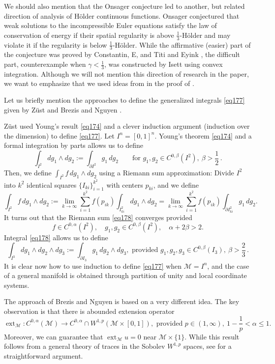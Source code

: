 \documentclass[intlimits,12pt,reqno]{amsart}
\newcommand{\cM}{\mathcal M}
\numberwithin{equation}{section}
\def\ext{\operatorname{ext}}
\theoremstyle{definition}
\begin{document}
We should also mention that the Onsager conjecture \cite{Onsager} led to another, but related direction of analysis of H\"older continuous functions. Onsager conjectured that weak solutions to the incompressible Euler equations satisfy
the law of conservation of energy if their spatial regularity is above $\frac{1}{3}$-H\"older and 
may violate it if the regularity is below $\frac{1}{3}$-H\"older. While the affirmative (easier) part of the conjecture was proved by Constantin, E, and Titi \cite{CET94} and Eyink \cite{Eyink}, the difficult part, counterexample when $\gamma<\frac{1}{3}$, was constructed by Isett \cite{Isett} using convex integration. Although we will not mention this direction of research in the paper, we want to emphasize that we used ideas from \cite{CET94} in the proof of .

Let us briefly mention the approaches to define the generalized integrals \eqref{eq177} given by Z\"ust \cite{zust1,zust2} and Brezis and Nguyen \cite{brezisn1,brezisn2}.

Z\"ust used Young's result \eqref{eq174} and a clever induction argument (induction over the dimension) to define \eqref{eq177}. 
Let $I^n=[0,1]^n$. Young's theorem \eqref{eq174} and a formal integration by parts allows us to define
$$
\int_{I^2} dg_1\wedge dg_2:=\int_{\partial I^2} g_1\, dg_2
\qquad
\text{for } g_1,g_2\in C^{0,\beta}(I^2),\ \textstyle{\beta>\frac{1}{2}}\, .
$$
Then, we define $\int_{I^2}f\, dg_1\wedge dg_2$ using a Riemann sum approximation: Divide $I^2$ into $k^2$ identical squares $\{I_{ki}\}_{i=1}^{k^2}$ with centers $p_{ki}$, and we define
\begin{equation}
\label{eq178}
\int_{I^2} f\, dg_1\wedge dg_2:=
\lim_{k\to\infty}\sum_{i=1}^{k^2} f(p_{ik})\int_{I_{ki}^2} dg_1\wedge dg_2=
\lim_{k\to\infty}\sum_{i=1}^{k^2} f(p_{ik})\int_{\partial I_{ki}^2} g_1\, dg_2.
\end{equation}
It turns out that the Riemann sum \eqref{eq178} converges provided
$$
f\in C^{0,\alpha}(I^2),
\quad
g_1,g_2\in C^{0,\beta}(I^2),
\quad
\alpha+2\beta>2.
$$
Integral \eqref{eq178} allows us to define
$$
\int_{I^3}dg_1\wedge dg_2\wedge dg_3:=\int_{\partial I_3}g_1\, dg_2\wedge dg_3,
\text{ provided } g_1,g_2,g_3\in C^{0,\beta}(I_3),\ \textstyle{\beta>\frac{2}{3}}\, .
$$
It is clear now how to use induction to define \eqref{eq177} when $\cM=I^n$, and the case of a general manifold is obtained through partition of unity and local coordinate systems.

The approach of Brezis and Nguyen is based on a very different idea. The key observation is that there is abounded extension operator
$$
\ext_\cM:C^{0,\alpha}(\cM)\to C^{0,\alpha}\cap W^{1,p}(\cM\times [0,1]),
\text{ provided }  p\in (1,\infty),\ \textstyle{1-\frac{1}{p}<\alpha\leq 1}.
$$
Moreover, we can guarantee that $\ext_\cM u=0$ near $\cM\times\{ 1\}$.
While this result follows from a general theory of traces in the Sobolev $W^{1,p}$ spaces, see  for a straightforward argument.
\end{document}
